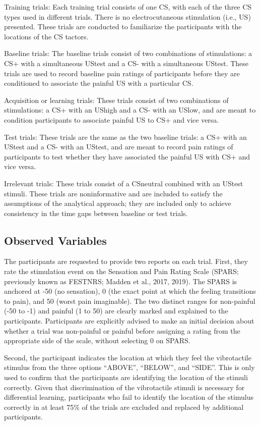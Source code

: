 \documentclass{article}
\begin{document}
Training trials: Each training trial consists of one CS, with each of the three CS types used in different trials. There is no electrocutaneous stimulation (i.e., US) presented. These trials are conducted to familiarize the participants with the locations of the CS tactors. 

Baseline trials: The baseline trials consist of two combinations of stimulations: a CS+ with a simultaneous UStest and a CS- with a simultaneous UStest. These trials are used to record baseline pain ratings of participants before they are conditioned to associate the painful US with a particular CS.

Acquisition or learning trials: These trials consist of two combinations of stimulations: a CS+ with an UShigh and a CS- with an USlow, and are meant to condition participants to associate painful US to CS+ and vice versa.

Test trials: These trials are the same as the two baseline trials: a CS+ with an UStest and a CS- with an UStest, and are meant to record pain ratings of participants to test whether they have associated the painful US with CS+ and vice versa.

Irrelevant trials: These trials consist of a CSneutral combined with an UStest stimuli. These trials are noninformative and are included to satisfy the assumptions of the analytical approach; they are included only to achieve consistency in the time gaps between baseline or test trials. 

\subsection{Observed Variables}

The participants are requested to provide two reports on each trial. First, they rate the stimulation event on the Sensation and Pain Rating Scale (SPARS; previously known as FESTNRS; Madden et al., 2017, 2019). The SPARS is anchored at -50 (no sensation), 0 (the exact point at which the feeling transitions to pain), and 50 (worst pain imaginable). The two distinct ranges for non-painful (-50 to -1) and painful (1 to 50) are clearly marked and explained to the participants. Participants are explicitly advised to make an initial decision about whether a trial was non-painful or painful before assigning a rating from the appropriate side of the scale, without selecting 0 on SPARS. 

Second, the participant indicates the location at which they feel the vibrotactile stimulus from the three options “ABOVE”, “BELOW”, and “SIDE”. This is only used to confirm that the participants are identifying the location of the stimuli correctly. Given that discrimination of the vibrotactile stimuli is necessary for differential learning, participants who fail to identify the location of the stimulus correctly in at least 75\% of the trials are excluded and replaced by additional participants.
\end{document}
